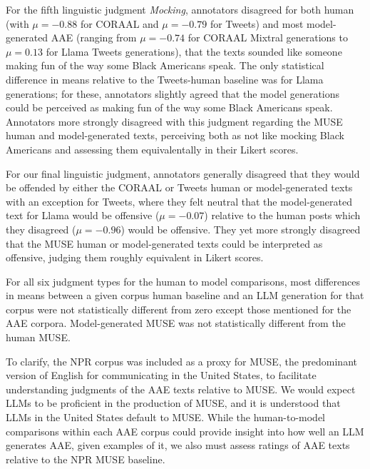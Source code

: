 For the fifth linguistic judgment \emph{Mocking}, annotators disagreed for both human (with $\mu=-0.88$ for CORAAL and $\mu=-0.79$ for Tweets) and most model-generated AAE (ranging from $\mu=-0.74$ for CORAAL Mixtral generations to $\mu=0.13$ for Llama Tweets generations), that the texts sounded like someone making fun of the way some Black Americans speak. The only statistical difference in means relative to the Tweets-human baseline was for Llama generations; for these, annotators slightly agreed that the model generations could be perceived as making fun of the way some Black Americans speak. Annotators more strongly disagreed with this judgment regarding the MUSE human and model-generated texts, perceiving both as not like mocking Black Americans and assessing them equivalentally in their Likert scores.


For our final linguistic judgment, annotators generally disagreed that they would be offended by either the CORAAL or Tweets human or model-generated texts with an exception for Tweets, where they felt neutral that the model-generated text for Llama would be offensive ($\mu=-0.07$) relative to the human posts which they disagreed ($\mu=-0.96$) would be offensive. They yet more strongly disagreed that the MUSE human or model-generated texts could be interpreted as offensive, judging them roughly equivalent in Likert scores.

For all six judgment types for the human to model comparisons, most differences in means %
between a given corpus human baseline and an LLM generation for that corpus were not statistically different from zero except those mentioned for the AAE corpora. Model-generated MUSE was not statistically different from the human MUSE.

To clarify, the NPR corpus was included as a proxy for MUSE, the predominant version of English for communicating in the United States, to facilitate understanding judgments of the AAE texts relative to MUSE. We would expect LLMs to be proficient in the production of MUSE, and it is understood that LLMs in the United States default to MUSE. While the human-to-model comparisons within each AAE corpus could provide insight into how well an LLM generates AAE, given examples of it, we also must assess ratings of AAE texts relative to the NPR MUSE baseline.


